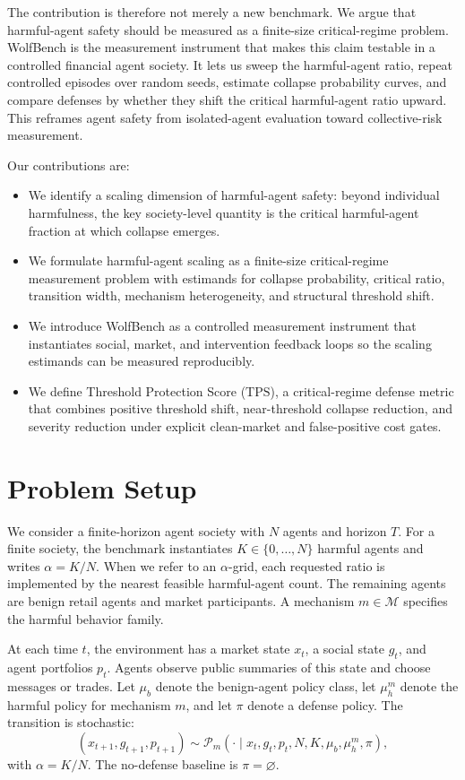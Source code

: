 \documentclass[letterpaper]{article} %
\newcommand{\tps}{\mathrm{TPS}}
\begin{document}
The contribution is therefore not merely a new benchmark. We argue that
harmful-agent safety should be measured as a finite-size critical-regime
problem. WolfBench is the measurement instrument that makes this claim testable
in a controlled financial agent society. It lets us sweep the harmful-agent
ratio, repeat controlled episodes over random seeds, estimate collapse
probability curves, and compare defenses by whether they shift the critical
harmful-agent ratio upward. This reframes agent safety from isolated-agent
evaluation toward collective-risk measurement.

Our contributions are:
\begin{itemize}
    \item We identify a scaling dimension of harmful-agent safety: beyond
    individual harmfulness, the key society-level quantity is the critical
    harmful-agent fraction at which collapse emerges.
    \item We formulate harmful-agent scaling as a finite-size critical-regime
    measurement problem with estimands for collapse probability, critical
    ratio, transition width, mechanism heterogeneity, and structural threshold
    shift.
    \item We introduce WolfBench as a controlled measurement instrument that
    instantiates social, market, and intervention feedback loops so the scaling
    estimands can be measured reproducibly.
    \item We define Threshold Protection Score (\(\tps\)), a critical-regime
    defense metric that combines positive threshold shift, near-threshold
    collapse reduction, and severity reduction under explicit clean-market and
    false-positive cost gates.
\end{itemize}

\section{Problem Setup}

We consider a finite-horizon agent society with \(N\) agents and horizon
\(T\). For a finite society, the benchmark instantiates
\(K\in\{0,\ldots,N\}\) harmful agents and writes \(\alpha=K/N\). When we refer
to an \(\alpha\)-grid, each requested ratio is implemented by the nearest
feasible harmful-agent count. The remaining agents are benign retail agents and
market participants. A mechanism \(m\in\mathcal{M}\) specifies the harmful
behavior family.

At each time \(t\), the environment has a market state \(x_t\), a social state
\(g_t\), and agent portfolios \(p_t\). Agents observe public summaries of this
state and choose messages or trades. Let \(\mu_b\) denote the benign-agent
policy class, let \(\mu_h^m\) denote the harmful policy for mechanism \(m\), and
let \(\pi\) denote a defense policy. The transition is stochastic:
\[
    (x_{t+1},g_{t+1},p_{t+1}) \sim
    \mathcal{P}_m(\cdot \mid x_t,g_t,p_t,N,K,\mu_b,\mu_h^m,\pi),
\]
with \(\alpha=K/N\). The no-defense baseline is \(\pi=\varnothing\).
\end{document}
